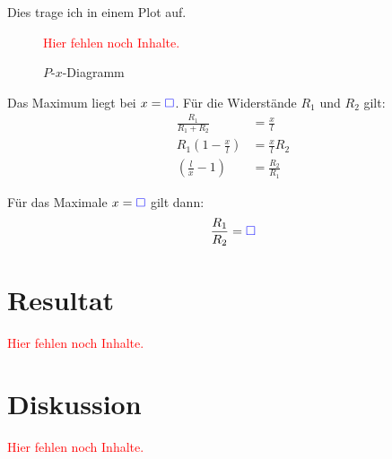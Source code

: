 \documentclass[11pt,german]{article}
\newcommand{\messwert}{\textcolor{blue}{\square}}
\newcommand{\fehlt}{\textcolor{red}{Hier fehlen noch Inhalte.}}
\begin{document}
Dies trage ich in einem Plot auf.

\begin{figure}[h!]
	\centering
	\fehlt
	\caption{$P$-$x$-Diagramm}
\end{figure}

Das Maximum liegt bei $x = \messwert$. Für die Widerstände $R_1$ und $R_2$ gilt:
\begin{align*}
	\frac{R_1}{R_1 + R_2} &= \frac{x}{l} \\
	R_1 \left( 1 - \frac{x}{l} \right) &= \frac{x}{l} R_2 \\
		   \left( \frac{l}{x} - 1 \right) &= \frac{R_2}{R_1}
\end{align*}

Für das Maximale $x = \messwert$ gilt dann:
\[ \frac{R_1}{R_2} = \messwert \]


\section{Resultat}

\fehlt


\section{Diskussion}

\fehlt
\end{document}
